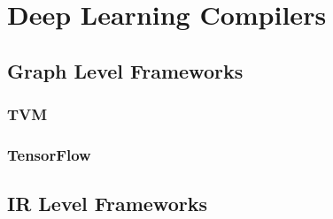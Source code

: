 
\chapter{Deep Learning Compilers} %

\label{Chapter2} %


\section{Graph Level Frameworks}


\subsection{TVM}


\subsection{TensorFlow}


\section{IR Level Frameworks}



